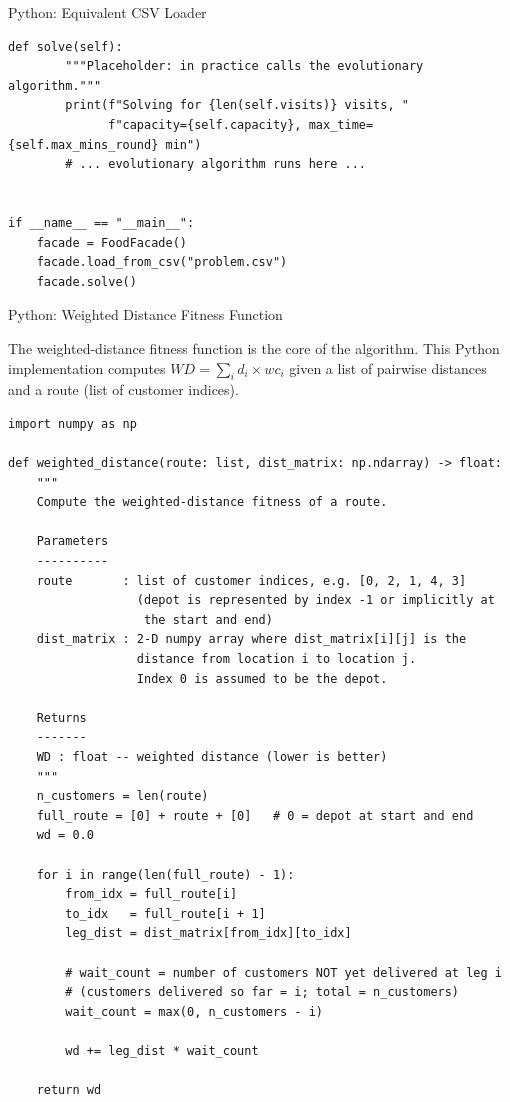 \documentclass[aspectratio=169,10pt]{beamer}
\begin{document}
\begin{frame}[fragile]{Python: Equivalent CSV Loader}
\begin{lstlisting}[style=python,
    caption={Python equivalent of the food delivery CSV loader.},
    label={lst:python_loader}]
    def solve(self):
        """Placeholder: in practice calls the evolutionary algorithm."""
        print(f"Solving for {len(self.visits)} visits, "
              f"capacity={self.capacity}, max_time={self.max_mins_round} min")
        # ... evolutionary algorithm runs here ...


if __name__ == "__main__":
    facade = FoodFacade()
    facade.load_from_csv("problem.csv")
    facade.solve()
\end{lstlisting}

\end{frame}

\begin{frame}[fragile]{Python: Weighted Distance Fitness Function}

  The weighted-distance fitness function is the core of the algorithm.
  This Python implementation computes $WD = \sum_i d_i \times wc_i$
  given a list of pairwise distances and a route (list of customer
  indices).

\begin{lstlisting}[style=python,
    caption={Python: computing the weighted-distance fitness.},
    label={lst:python_wd}]
import numpy as np

def weighted_distance(route: list, dist_matrix: np.ndarray) -> float:
    """
    Compute the weighted-distance fitness of a route.

    Parameters
    ----------
    route       : list of customer indices, e.g. [0, 2, 1, 4, 3]
                  (depot is represented by index -1 or implicitly at
                   the start and end)
    dist_matrix : 2-D numpy array where dist_matrix[i][j] is the
                  distance from location i to location j.
                  Index 0 is assumed to be the depot.

    Returns
    -------
    WD : float -- weighted distance (lower is better)
    """
    n_customers = len(route)
    full_route = [0] + route + [0]   # 0 = depot at start and end
    wd = 0.0

    for i in range(len(full_route) - 1):
        from_idx = full_route[i]
        to_idx   = full_route[i + 1]
        leg_dist = dist_matrix[from_idx][to_idx]

        # wait_count = number of customers NOT yet delivered at leg i
        # (customers delivered so far = i; total = n_customers)
        wait_count = max(0, n_customers - i)

        wd += leg_dist * wait_count

    return wd



\end{lstlisting}
\end{frame}
\end{document}
